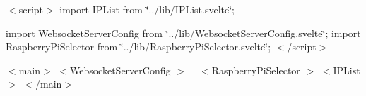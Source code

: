 $<$script$>$ import IPList from \char`\"{}../lib/\+IPList.\+svelte\char`\"{};

import Websocket\+Server\+Config from \char`\"{}../lib/\+Websocket\+Server\+Config.\+svelte\char`\"{}; import Raspberry\+Pi\+Selector from \char`\"{}../lib/\+Raspberry\+Pi\+Selector.\+svelte\char`\"{}; $<$/script$>$

$<$main$>$   $<$\+Websocket\+Server\+Config $>$ 
 ~\newline
 $<$\+Raspberry\+Pi\+Selector $>$   $<$\+IPList $>$   $<$/main$>$ 